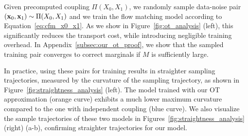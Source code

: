 
\fi

\iffalse
With these three quantities computed, we can now obtain the training pairs.
%
In each training iteration, for every training shape, we first sample $N$ points from its precomputed $X_1$ to obtain $\rvx_1$.
%
For each point in $\rvx_1$, we then obtain the corresponding points in $X_0$ using the \phil{precomputed} bijective map $\Pi$ to obtain $\rvx_0$.
%
Using this sampled training pair $(\rvx_0, \rvx_1)$, we train the flow matching model according to Equation~\ref{eq:cfm_x0_x1}.
\fi
%
Given precomputed coupling $\Pi(X_0, X_1)$, we randomly sample data-noise pair $({\mathbf{x}}_0, {\mathbf{x}}_1) \sim \Pi(X_0, X_1)$ and we train the flow matching model according to Equation~\ref{eq:cfm_x0_x1}. As we show in Figure~\ref{fig:ot_analysis} (left), this significantly reduces the transport cost, while introducing negligible training overhead. In Appendix~\ref{subsec:our_ot_proof}, we show that the sampled training pair converges to correct marginals if $M$ is sufficiently large.

\iffalse
Overall, this procedure significantly reduces the distances between training pairs (as shown in the green curve of Figure~\ref{fig:ot_analysis} (left)), while introducing negligible training overhead.
%
Besides, the sampled training pair converges to the correct marginal if $M$ is sufficiently large, \ie, $\int q(\rvx_0, \rvx_1) dx_1 = q_0(\rvx_0)$ and $\int q(\rvx_0, \rvx_1) dx_0 = q_1(\rvx_1)$. 
%
A detailed proof is provided in the Appendix.
\fi



%
In practice, using these pairs for training results in straighter sampling trajectories, measured by the curvature of the sampling trajectory, as shown in Figure~\ref{fig:straightness_analysis} (left). 
%
The model trained with our OT approximation (orange curve) exhibits a much lower maximum curvature compared to the one with independent coupling (blue curve).
%
We also visualize the sample trajectories of these two models in Figures~\ref{fig:straightness_analysis} (right) (a-b), confirming straighter trajectories for our model.

